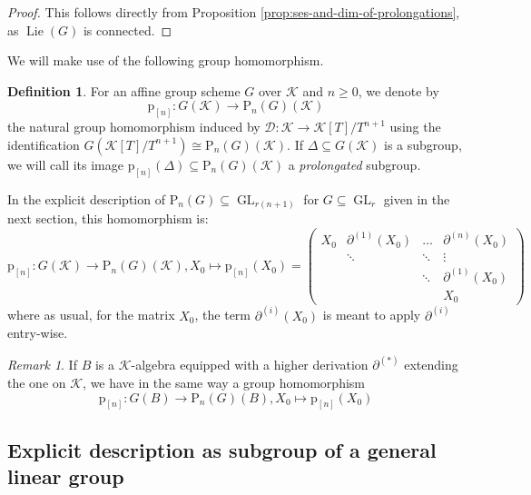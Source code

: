 \documentclass[10pt,a4paper]{amsart}
\theoremstyle{plain} %
\theoremstyle{definition}
\newtheorem{Definition}[Theorem]{Definition}
\theoremstyle{remark}
\newtheorem{Remark}[Theorem]{Remark}
\newcommand{\cK}{\mathcal{K}}   %
\newcommand{\rP}[1]{\mathrm{P}_{\!#1}}
\newcommand{\GL}{\operatorname{GL}}
\newcommand{\Lie}{\operatorname{Lie}}
\newcommand{\hd}[2]{\partial^{(#1)}\!\!\left(#2\right)} %
\newcommand{\hde}[1]{\partial^{(#1)}}  %
\newcommand{\D}{\mathcal{D}} %
\newcommand{\prol}[1]{\mathrm{p}_{[#1]}}
\numberwithin{equation}{subsection}
\begin{document}
\begin{proof}
This follows directly from Proposition \ref{prop:ses-and-dim-of-prolongations}, as $\Lie(G)$ is connected.
\end{proof}


We will make use of the following group homomorphism.

\begin{Definition}\label{def:gammatohyper}
For an affine group scheme $G$ over $\cK$ and $n\geq 0$, we denote by
\[ \prol{n}: G(\cK)\to \rP{n}(G)(\cK) \]
the natural group homomorphism induced by $\D:\cK\to \cK[T]/T^{n+1}$ using the identification $G(\cK[T]/T^{n+1})\cong \rP{n}(G)(\cK)$. If $\Delta\subseteq G(\cK)$ is a subgroup, we will call its image $\prol{n}(\Delta)\subseteq \rP{n}(G)(\cK)$ a \emph{prolongated} subgroup.


\end{Definition}

In the explicit description of $\rP{n}(G)\subseteq \GL_{r(n+1)}$ for $G\subseteq \GL_r$ given in the next section, this homomorphism is:
\begin{equation}\label{eq:gammatohyper}
	\prol{n}: G(\cK)\to \rP{n}(G)(\cK), X_0\mapsto \prol{n}(X_0)=\begin{pmatrix}
			X_0 & \hd{1}{X_0} & \dots& \hd{n}{X_0} \\
			&    \ddots     & \ddots&\vdots\\
			&&\ddots&\hd{1}{X_0}\\
			&&&X_0
		\end{pmatrix}
\end{equation}
where as usual, for the matrix $X_0$, the term $\hd{i}{X_0}$ is meant to apply $\hde{i}$ entry-wise.

\begin{Remark}
If $B$ is a $\cK$-algebra equipped with a higher derivation $\hde{*}$ extending the one on $\cK$, we have in the same way a group homomorphism 
\begin{equation}\label{eq:gammatohyperoverB}
	\prol{n}: G(B)\to \rP{n}(G)(B), X_0\mapsto \prol{n}(X_0)
\end{equation}
\end{Remark}


\subsection{Explicit description as subgroup of a general linear group}\label{SubS:prolongation-as-subgroup-of-GL}
\end{document}
